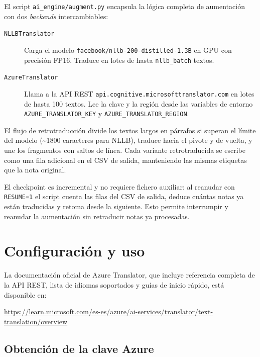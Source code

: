 El script \texttt{ai\_engine/augment.py} encapsula la lógica completa de aumentación con dos \emph{backends} intercambiables:

\begin{description}
  \item[\texttt{NLLBTranslator}] Carga el modelo \texttt{facebook/nllb-200-distilled-1.3B} en GPU con precisión FP16. Traduce en lotes de hasta \texttt{nllb\_batch} textos.
  \item[\texttt{AzureTranslator}] Llama a la API REST \texttt{api.cognitive.microsofttranslator.com} en lotes de hasta 100 textos. Lee la clave y la región desde las variables de entorno \texttt{AZURE\_TRANSLATOR\_KEY} y \texttt{AZURE\_TRANSLATOR\_REGION}.
\end{description}

El flujo de retrotraducción divide los textos largos en párrafos si superan el límite del modelo (\textasciitilde 1800 caracteres para NLLB), traduce hacia el pivote y de vuelta, y une los fragmentos con saltos de línea. Cada variante retrotraducida se escribe como una fila adicional en el CSV de salida, manteniendo las mismas etiquetas que la nota original.

El checkpoint es incremental y no requiere fichero auxiliar: al reanudar con \texttt{RESUME=1} el script cuenta las filas del CSV de salida, deduce cuántas notas ya están traducidas y retoma desde la siguiente. Esto permite interrumpir y reanudar la aumentación sin retraducir notas ya procesadas.

\section{Configuración y uso}

La documentación oficial de Azure Translator, que incluye referencia completa de la API REST, lista de idiomas soportados y guías de inicio rápido, está disponible en:

\begin{center}
\url{https://learn.microsoft.com/es-es/azure/ai-services/translator/text-translation/overview}
\end{center}

\subsection{Obtención de la clave Azure}

